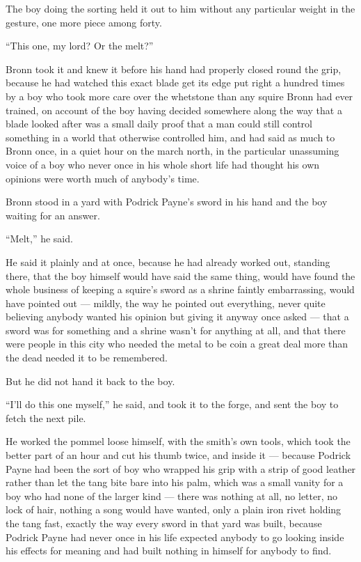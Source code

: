 The boy doing the sorting held it out to him without any particular weight in the gesture, one more piece among forty.

“This one, my lord? Or the melt?”

Bronn took it and knew it before his hand had properly closed round the grip, because he had watched this exact blade get its edge put right a hundred times by a boy who took more care over the whetstone than any squire Bronn had ever trained, on account of the boy having decided somewhere along the way that a blade looked after was a small daily proof that a man could still control something in a world that otherwise controlled him, and had said as much to Bronn once, in a quiet hour on the march north, in the particular unassuming voice of a boy who never once in his whole short life had thought his own opinions were worth much of anybody’s time.

Bronn stood in a yard with Podrick Payne’s sword in his hand and the boy waiting for an answer.

“Melt,” he said.

He said it plainly and at once, because he had already worked out, standing there, that the boy himself would have said the same thing, would have found the whole business of keeping a squire’s sword as a shrine faintly embarrassing, would have pointed out — mildly, the way he pointed out everything, never quite believing anybody wanted his opinion but giving it anyway once asked — that a sword was for something and a shrine wasn’t for anything at all, and that there were people in this city who needed the metal to be coin a great deal more than the dead needed it to be remembered.

But he did not hand it back to the boy.

“I’ll do this one myself,” he said, and took it to the forge, and sent the boy to fetch the next pile.

\sceneBreak

He worked the pommel loose himself, with the smith’s own tools, which took the better part of an hour and cut his thumb twice, and inside it — because Podrick Payne had been the sort of boy who wrapped his grip with a strip of good leather rather than let the tang bite bare into his palm, which was a small vanity for a boy who had none of the larger kind — there was nothing at all, no letter, no lock of hair, nothing a song would have wanted, only a plain iron rivet holding the tang fast, exactly the way every sword in that yard was built, because Podrick Payne had never once in his life expected anybody to go looking inside his effects for meaning and had built nothing in himself for anybody to find.


